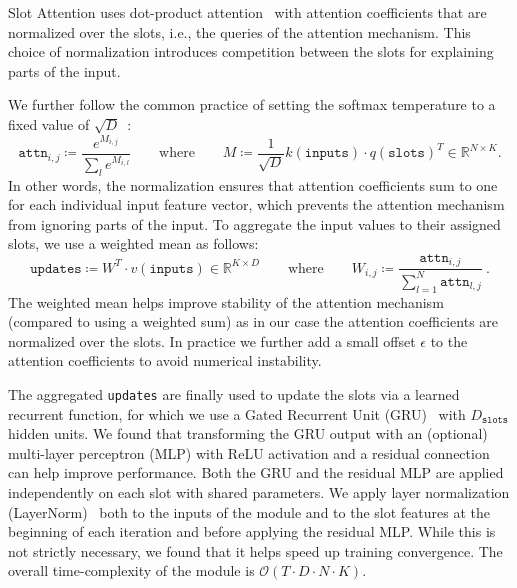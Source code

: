 \documentclass{article}
\newcommand{\slots}[0]{\texttt{slots}}
\newcommand{\attn}[0]{\texttt{attn}}
\newcommand{\inp}[0]{\texttt{inputs}}
\newcommand{\updates}[0]{\texttt{updates}}
\begin{document}
Slot Attention uses dot-product attention~\citep{luong2015effective} with attention coefficients that are normalized over the slots, i.e., the queries of the attention mechanism. This choice of normalization introduces competition between the slots for explaining parts of the input.

We further follow the common practice of setting the softmax temperature to a fixed value of $\sqrt{D}$~\citep{vaswani2017attention}:
\begin{equation}\label{eqn:slot_attention_key_query}
      \attn_{i, j} \coloneqq \frac{e^{M_{i, j}}}{\sum_l e^{M_{i, l}}} \qquad \text{where} \qquad M \coloneqq \frac{1}{\sqrt{D}}k(\inp) \cdot q(\slots)^T \in\mathbb{R}^{N\times K}.
\end{equation}
 In other words, the normalization ensures that attention coefficients sum to one for each individual input feature vector, which prevents the attention mechanism from ignoring parts of the input. To aggregate the input values to their assigned slots, we use a weighted mean as follows:
\begin{equation}\label{eqn:slot_attention_value}
    \updates \coloneqq W^T \cdot v(\inp) \in \mathbb{R}^{K \times D}  \qquad \text{where} \qquad W_{i, j} \coloneqq \frac{\attn_{i, j}}{\sum_{l=1}^N\attn_{l, j}} \ .
\end{equation}
The weighted mean helps improve stability of the attention mechanism (compared to using a weighted sum) as in our case the attention coefficients are normalized over the slots. In practice we further add a small offset $\epsilon$ to the attention coefficients to avoid numerical instability.

The aggregated \texttt{updates} are finally used to update the slots via a learned recurrent function, for which we use a Gated Recurrent Unit (GRU)~\citep{cho2014learning} with $D_\slots$ hidden units. We found that transforming the GRU output with an (optional) multi-layer perceptron (MLP) with ReLU activation and a residual connection~\citep{he2016deep} can help improve performance. Both the GRU and the residual MLP are applied independently on each slot with shared parameters. We apply layer normalization (LayerNorm)~\citep{ba2016layer} both to the inputs of the module and to the slot features at the beginning of each iteration and before applying the residual MLP. While this is not strictly necessary, we found that it helps speed up training convergence. The overall time-complexity of the module is $\mathcal{O}\left(T\cdot D \cdot N\cdot K \right)$.
\end{document}
